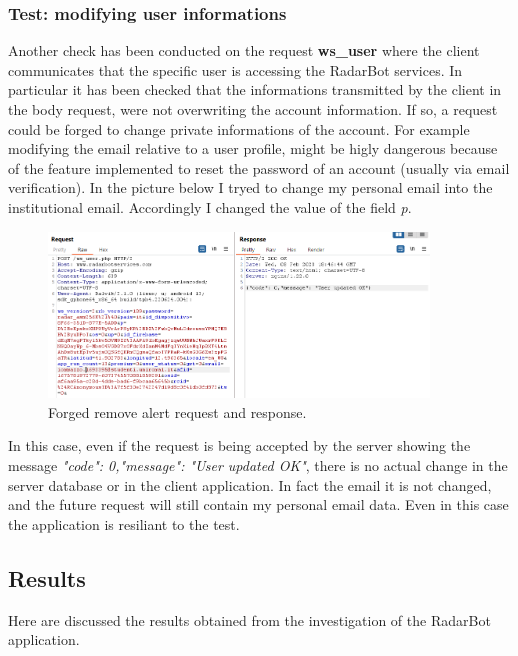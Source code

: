 		\subsubsection{Test: modifying user informations}
			\par Another check has been conducted on the request \textbf{ws\_user} where the client communicates that the specific user is accessing the RadarBot services. In particular it has been checked that the informations transmitted by the client in the body request, were not overwriting the account information. If so, a request could be forged to change private informations of the account. For example modifying the email relative to a user profile, might be higly dangerous because of the feature implemented to reset the password of an account (usually via email verification). In the picture below I tryed to change my personal email into the institutional email. Accordingly I changed the value of the field \textit{p}. 
			\begin{figure}[h]
				\centering
				\includegraphics[width=0.9\textwidth]{images/radarbot_changeemail.png}
				\caption{Forged remove alert request and response.}
			\end{figure}
			\par In this case, even if the request is being accepted by the server showing the message \textit{"code": 0,"message": "User updated OK"}, there is no actual change in the server database or in the client application. In fact the email it is not changed, and the future request will still contain my personal email data. Even in this case the application is resiliant to the test.

		
	\subsection{Results}
		\par Here are discussed the results obtained from the investigation of the RadarBot application.
